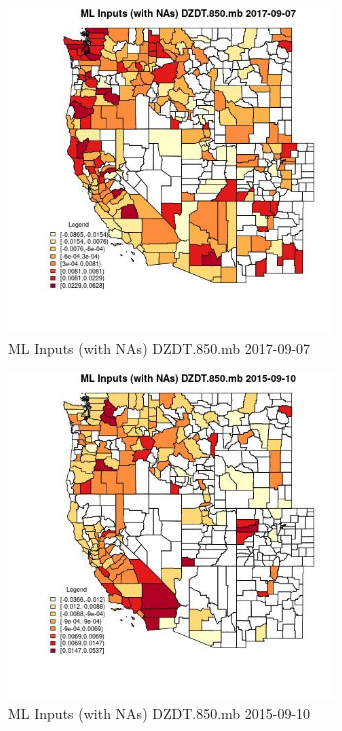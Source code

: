 \begin{figure} 
\centering  
\includegraphics[width=0.77\textwidth]{Code_Outputs/Report_ML_input_PM25_Step4_part_e_de_duplicated_aves_compiled_2019-05-21wNAs_CountyDZDT850mbMean2017-09-07.jpg} 
\caption{\label{fig:Report_ML_input_PM25_Step4_part_e_de_duplicated_aves_compiled_2019-05-21wNAsCountyDZDT850mbMean2017-09-07}ML Inputs (with NAs) DZDT.850.mb 2017-09-07} 
\end{figure} 
 

\begin{figure} 
\centering  
\includegraphics[width=0.77\textwidth]{Code_Outputs/Report_ML_input_PM25_Step4_part_e_de_duplicated_aves_compiled_2019-05-21wNAs_CountyDZDT850mbMean2015-09-10.jpg} 
\caption{\label{fig:Report_ML_input_PM25_Step4_part_e_de_duplicated_aves_compiled_2019-05-21wNAsCountyDZDT850mbMean2015-09-10}ML Inputs (with NAs) DZDT.850.mb 2015-09-10} 
\end{figure} 
 

